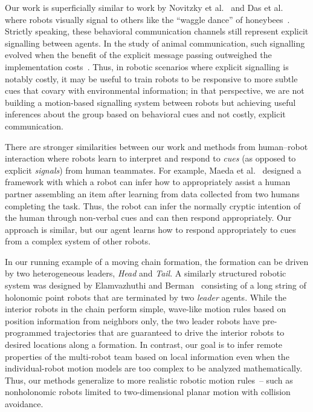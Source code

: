 \documentclass[letterpaper, 10 pt, conference]{ieeeconf}  %
\begin{document}
	Our work is superficially similar to work by Novitzky et
	al.~\cite{NPCBW12} and Das et al.~\cite{DCV16} where robots visually
	signal to others like the ``waggle dance'' of
	honeybees~\cite{VonFrisch67, DC04}. Strictly speaking, these behavioral
	communication channels still represent explicit signalling between
	agents. In the study of animal communication, such signalling evolved
	when the benefit of the explicit message passing outweighed the
	implementation costs~\cite{BV11}. Thus, in robotic scenarios where
	explicit signalling is notably costly, it may be useful to train robots
	to be responsive to more subtle cues that covary with environmental
	information; in that perspective, we are not building a motion-based
	signalling system between robots but achieving useful inferences about
	the group based on behavioral cues and not costly, explicit
	communication.
	
	There are stronger similarities between our work and methods from
	human--robot interaction where robots learn to interpret and respond to
	\emph{cues} (as opposed to explicit \emph{signals}) from human
	teammates. For example, Maeda et al.~\cite{MELAPN14} designed a
	framework with which a robot can infer how to appropriately assist a human
	partner assembling an item after learning from data collected from two
	humans completing the task. Thus, the robot can infer the normally
	cryptic intention of the human through non-verbal cues and can then
	respond appropriately. Our approach is similar, but our agent learns how
	to respond appropriately to cues from a complex system of other robots.
	
	In our running example of a moving chain formation, the formation can be
	driven by two heterogeneous leaders, \emph{Head} and \emph{Tail}. A
	similarly structured robotic system was designed by Elamvazhuthi and
	Berman~\cite{EB16} consisting of a long string of holonomic point robots
	that are terminated by two \emph{leader} agents. While the interior
	robots in the chain perform simple, wave-like motion rules based on
	position information from neighbors only, the two leader robots have
	pre-programmed trajectories that are guaranteed to drive the interior
	robots to desired locations along a formation. In contrast, our goal is
	to infer remote properties of the multi-robot team based on local
	information even when the individual-robot motion models are too complex
	to be analyzed mathematically. Thus, our methods generalize to more
	realistic robotic motion rules~-- such as nonholonomic robots limited to
	two-dimensional planar motion with collision avoidance.
	
\end{document}
